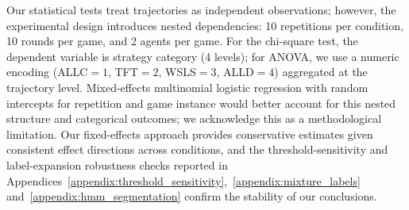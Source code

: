 \documentclass[a4paper,fleqn]{cas-sc}
\begin{document}
\begin{table}[pos=H]
\centering
\caption{Statistical validation summary: (a) hypothesis tests for stake effects, (b) classifier comparison for strategy recognition ($n=80{,}640$ test samples, 4-strategy, $5\%$ noise).}
\label{tab:combined_validation}
\footnotesize
{}
\end{table}

Our statistical tests treat trajectories as independent observations; however, the experimental design introduces nested dependencies: 10 repetitions per condition, 10 rounds per game, and 2 agents per game. For the chi-square test, the dependent variable is strategy category (4 levels); for ANOVA, we use a numeric encoding (ALLC$=1$, TFT$=2$, WSLS$=3$, ALLD$=4$) aggregated at the trajectory level. Mixed-effects multinomial logistic regression with random intercepts for repetition and game instance would better account for this nested structure and categorical outcomes; we acknowledge this as a methodological limitation. Our fixed-effects approach provides conservative estimates given consistent effect directions across conditions, and the threshold-sensitivity and label-expansion robustness checks reported in Appendices~\ref{appendix:threshold_sensitivity},~\ref{appendix:mixture_labels} and~\ref{appendix:hmm_segmentation} confirm the stability of our conclusions.
\end{document}
